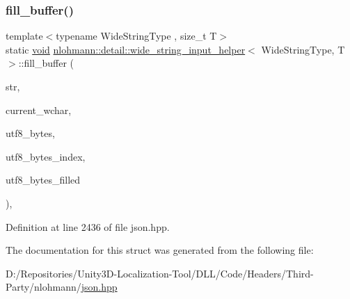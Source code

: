 \subsubsection{\texorpdfstring{fill\_buffer()}{fill\_buffer()}}
{\footnotesize\ttfamily template$<$typename Wide\+String\+Type , size\+\_\+t T$>$ \\
static \mbox{\hyperlink{namespacenlohmann_1_1detail_a59fca69799f6b9e366710cb9043aa77d}{void}} \mbox{\hyperlink{structnlohmann_1_1detail_1_1wide__string__input__helper}{nlohmann\+::detail\+::wide\+\_\+string\+\_\+input\+\_\+helper}}$<$ Wide\+String\+Type, T $>$\+::fill\+\_\+buffer (\begin{DoxyParamCaption}\item[{const Wide\+String\+Type \&}]{str,  }\item[{size\+\_\+t \&}]{current\+\_\+wchar,  }\item[{\mbox{\hyperlink{namespacenlohmann_1_1detail_a1ed8fc6239da25abcaf681d30ace4985af1f713c9e000f5d3f280adbd124df4f5}{std\+::array}}$<$ std\+::char\+\_\+traits$<$ char $>$\+::int\+\_\+type, 4 $>$ \&}]{utf8\+\_\+bytes,  }\item[{size\+\_\+t \&}]{utf8\+\_\+bytes\+\_\+index,  }\item[{size\+\_\+t \&}]{utf8\+\_\+bytes\+\_\+filled }\end{DoxyParamCaption})\hspace{0.3cm}{\ttfamily [inline]}, {\ttfamily [static]}}



Definition at line 2436 of file json.\+hpp.



The documentation for this struct was generated from the following file\+:\begin{DoxyCompactItemize}
\item 
D\+:/\+Repositories/\+Unity3\+D-\/\+Localization-\/\+Tool/\+D\+L\+L/\+Code/\+Headers/\+Third-\/\+Party/nlohmann/\mbox{\hyperlink{json_8hpp}{json.\+hpp}}\end{DoxyCompactItemize}
